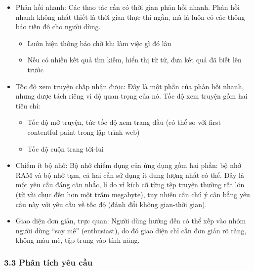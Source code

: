 \begin{itemize}
  \item
        Phản hồi nhanh: Các thao tác cần có thời gian phản hồi nhanh. Phản hồi
        nhanh không nhất thiết là thời gian thực thi ngắn, mà là luôn có các
        thông báo tiến độ cho người dùng.

        \begin{itemize}
          
          \item
                Luôn hiện thông báo chờ khi làm việc gì đó lâu
          \item
                Nếu có nhiều kết quả tìm kiếm, hiển thị từ từ, đưa kết quả đã biết
                lên trước
        \end{itemize}
  \item
        Tốc độ xem truyện chấp nhận được: Đây là một phần của phản hồi nhanh,
        nhưng được tách riêng vì độ quan trọng của nó. Tốc độ xem truyện gồm
        hai tiêu chí:

        \begin{itemize}
          
          \item
                Tốc độ mở truyện, tức tốc độ xem trang đầu (có thể so với first
                contentful paint trong lập trình web)
          \item
                Tốc độ cuộn trang tới-lui
        \end{itemize}
  \item
        Chiếm ít bộ nhớ: Bộ nhớ chiếm dụng của ứng dụng gồm hai phần: bộ nhớ
        RAM và bộ nhớ tạm, cả hai cần sử dụng ít dung lượng nhất có thể. Đây
        là một yêu cầu đáng cân nhắc, lí do vì kích cỡ từng tệp truyện thường
        rất lớn (từ vài chục đến hơn một trăm megabyte), tuy nhiên cần chú ý
        cân bằng yêu cầu này với yêu cầu về tốc độ (đánh đổi không gian-thời
        gian).
  \item
        Giao diện đơn giản, trực quan: Người dùng hướng đến có thể xếp vào
        nhóm người dùng ``say mê'' (enthusiast), do đó giao diện chỉ cần đơn
        giản rõ ràng, không màu mè, tập trung vào tính năng.
\end{itemize}

\hypertarget{phuxe2n-tuxedch-yuxeau-cux1ea7u}{%
  \subsubsection{\texorpdfstring{3.3 Phân tích yêu cầu
    }{3.3 Phân tích yêu cầu }}\label{phuxe2n-tuxedch-yuxeau-cux1ea7u}}

